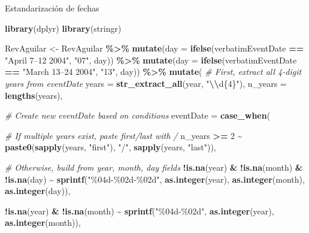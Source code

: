 \documentclass[sn-apa,pdflatex]{sn-jnl}
\newenvironment{Shaded}{\begin{snugshade}}{\end{snugshade}}
\newcommand{\AttributeTok}[1]{\textcolor[rgb]{0.13,0.29,0.53}{#1}}
\newcommand{\CommentTok}[1]{\textcolor[rgb]{0.56,0.35,0.01}{\textit{#1}}}
\newcommand{\DecValTok}[1]{\textcolor[rgb]{0.00,0.00,0.81}{#1}}
\newcommand{\FunctionTok}[1]{\textcolor[rgb]{0.13,0.29,0.53}{\textbf{#1}}}
\newcommand{\NormalTok}[1]{#1}
\newcommand{\OtherTok}[1]{\textcolor[rgb]{0.56,0.35,0.01}{#1}}
\newcommand{\SpecialCharTok}[1]{\textcolor[rgb]{0.81,0.36,0.00}{\textbf{#1}}}
\newcommand{\StringTok}[1]{\textcolor[rgb]{0.31,0.60,0.02}{#1}}
\begin{document}
Estandarización de fechas

\begin{Shaded}
\begin{Highlighting}[]
\FunctionTok{library}\NormalTok{(dplyr)}
\FunctionTok{library}\NormalTok{(stringr)}

\NormalTok{RevAguilar }\OtherTok{\textless{}{-}}\NormalTok{ RevAguilar }\SpecialCharTok{\%\textgreater{}\%}  
  \FunctionTok{mutate}\NormalTok{(}\AttributeTok{day =} \FunctionTok{ifelse}\NormalTok{(verbatimEventDate }\SpecialCharTok{==} \StringTok{"April 7–12 2004"}\NormalTok{, }\StringTok{"07"}\NormalTok{, day)) }\SpecialCharTok{\%\textgreater{}\%}  
  \FunctionTok{mutate}\NormalTok{(}\AttributeTok{day =} \FunctionTok{ifelse}\NormalTok{(verbatimEventDate }\SpecialCharTok{==} \StringTok{"March 13–24 2004"}\NormalTok{, }\StringTok{"13"}\NormalTok{, day)) }\SpecialCharTok{\%\textgreater{}\%} 
  \FunctionTok{mutate}\NormalTok{(}
    \CommentTok{\# First, extract all 4{-}digit years from eventDate}
    \AttributeTok{years =} \FunctionTok{str\_extract\_all}\NormalTok{(year, }\StringTok{"}\SpecialCharTok{\textbackslash{}\textbackslash{}}\StringTok{d\{4\}"}\NormalTok{),}
    \AttributeTok{n\_years =} \FunctionTok{lengths}\NormalTok{(years),}
    
    \CommentTok{\# Create new eventDate based on conditions}
    \AttributeTok{eventDate =} \FunctionTok{case\_when}\NormalTok{(}
      
      \CommentTok{\# If multiple years exist, paste first/last with /}
\NormalTok{      n\_years }\SpecialCharTok{\textgreater{}=} \DecValTok{2} \SpecialCharTok{\textasciitilde{}} \FunctionTok{paste0}\NormalTok{(}\FunctionTok{sapply}\NormalTok{(years, }\StringTok{"first"}\NormalTok{), }\StringTok{"/"}\NormalTok{, }\FunctionTok{sapply}\NormalTok{(years, }\StringTok{"last"}\NormalTok{)),}
      
      \CommentTok{\# Otherwise, build from year, month, day fields}
      \SpecialCharTok{!}\FunctionTok{is.na}\NormalTok{(year) }\SpecialCharTok{\&} \SpecialCharTok{!}\FunctionTok{is.na}\NormalTok{(month) }\SpecialCharTok{\&} \SpecialCharTok{!}\FunctionTok{is.na}\NormalTok{(day) }\SpecialCharTok{\textasciitilde{}} 
        \FunctionTok{sprintf}\NormalTok{(}\StringTok{"\%04d{-}\%02d{-}\%02d"}\NormalTok{, }\FunctionTok{as.integer}\NormalTok{(year), }\FunctionTok{as.integer}\NormalTok{(month), }\FunctionTok{as.integer}\NormalTok{(day)),}
      
      \SpecialCharTok{!}\FunctionTok{is.na}\NormalTok{(year) }\SpecialCharTok{\&} \SpecialCharTok{!}\FunctionTok{is.na}\NormalTok{(month) }\SpecialCharTok{\textasciitilde{}} 
        \FunctionTok{sprintf}\NormalTok{(}\StringTok{"\%04d{-}\%02d"}\NormalTok{, }\FunctionTok{as.integer}\NormalTok{(year), }\FunctionTok{as.integer}\NormalTok{(month)),}
      

\end{Highlighting}
\end{Shaded}
\end{document}
